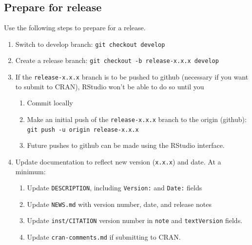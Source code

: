 \documentclass{article}
\begin{document}
\subsection{Prepare for release} 
\label{sec:prep-for-release}

Use the following steps to prepare for a release.

\begin{enumerate}

  \item Switch to develop branch: \texttt{git checkout develop}

  \item Create a release branch: \texttt{git checkout -b release-x.x.x develop} 

  \item If the \texttt{release-x.x.x} branch is to be pushed to github
        (necessary if you want to submit to CRAN), 
        RStudio won't be able to do so until you
  \begin{enumerate}

    \item Commit locally

    \item Make an initial push of the \texttt{release-x.x.x} branch
	      to the origin (github): 
		  \texttt{git push -u origin release-x.x.x} 
	
	\item Future pushes to github can be made using the RStudio interface.

  \end{enumerate}
  \item Update documentation to reflect new version (\texttt{x.x.x}) and date.
        At a minimum:
  \begin{enumerate}

    \item Update \texttt{DESCRIPTION}, including \texttt{Version:} and \texttt{Date:} fields 
	
    \item Update \texttt{NEWS.md} with version number, date, and release notes
    
	\item Update \texttt{inst/CITATION} version number 
	      in \texttt{note} and \texttt{textVersion} fields.
		  
    \item Update \texttt{cran-comments.md} if submitting to CRAN.


\end{enumerate}
\end{enumerate}
\end{document}
